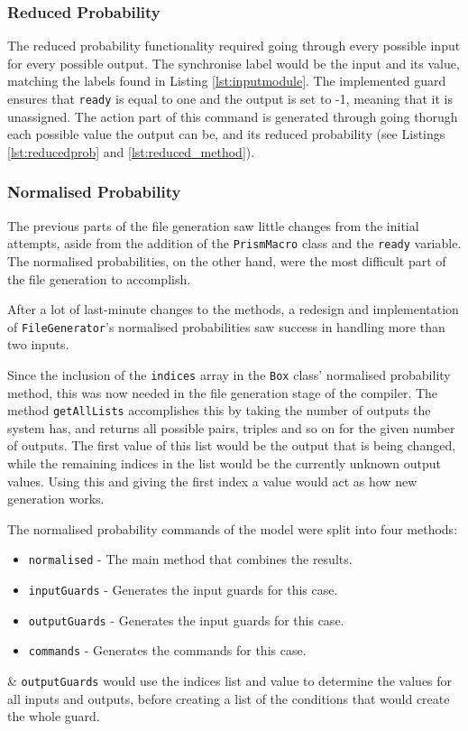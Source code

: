 \documentclass[report.tex]{subfiles}
\begin{document}
\subsubsection{Reduced Probability} %
\label{ssub:reduced_probability}
The reduced probability functionality required going through every possible
input for every possible output. The synchronise label would be the input and
its value, matching the labels found in Listing \ref{lst:inputmodule}. The
implemented guard ensures that \texttt{ready} is equal to one and the output
is set to -1, meaning that it is unassigned. The action part of this command is
generated through going thorugh each possible value the output can be, and its
reduced probability (see Listings \ref{lst:reducedprob} and 
\ref{lst:reduced_method}).

\subsubsection{Normalised Probability} %
\label{ssub:normalised_probability}
The previous parts of the file generation saw little changes from the initial
attempts, aside from the addition of the \texttt{PrismMacro} class and the
\texttt{ready} variable. The normalised probabilities, on the other hand, were
the most difficult part of the file generation to accomplish. 

After a lot of last-minute changes to the methods, a redesign and implementation
of \texttt{FileGenerator}'s normalised probabilities saw success in handling
more than two inputs.

Since the inclusion of the \texttt{indices} array in the \texttt{Box} class'
normalised probability method, this was now needed in the file generation stage
of the compiler. The method \texttt{getAllLists} accomplishes this by taking
the number of outputs the system has, and returns all possible pairs, triples
and so on for the given number of outputs. The first value of this list would
be the output that is being changed, while the remaining indices in the list
would be the currently unknown output values. Using this and giving the
first index a value would act as how new generation works.

The normalised probability commands of the model were split into four methods:
\begin{itemize}
    \item \texttt{normalised} - The main method that combines the results.
    \item \texttt{inputGuards} - Generates the input guards for this case.
    \item \texttt{outputGuards} - Generates the input guards for this case.
    \item \texttt{commands} - Generates the commands for this case.
\end{itemize}
 \& \texttt{outputGuards} would use the indices list and value
to determine the values for all inputs and outputs, before creating a list of
the conditions that would create the whole guard.
\end{document}

